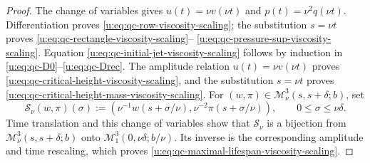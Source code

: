 \begin{proof}
The change of variables gives
\(u(t)=\nu v(\nu t)\) and \(p(t)=\nu^2q(\nu t)\).
Differentiation proves \eqref{u:eq:qc-row-viscosity-scaling}; the substitution
\(s=\nu t\) proves
\eqref{u:eq:qc-rectangle-viscosity-scaling}--%
\eqref{u:eq:qc-pressure-sup-viscosity-scaling}.
Equation \eqref{u:eq:qc-initial-jet-viscosity-scaling} follows by induction in
\eqref{u:eq:qc-D0}--\eqref{u:eq:qc-Drec}.  The amplitude relation
\(u(t)=\nu v(\nu t)\) proves
\eqref{u:eq:qc-critical-height-viscosity-scaling}, and the substitution
\(s=\nu t\) proves
\eqref{u:eq:qc-critical-height-mass-viscosity-scaling}.  For
\((w,\pi)\in\mathscr M_\nu^3(s,s+\delta;b)\), set
\[
 \mathcal S_\nu(w,\pi)(\sigma)
 :=
 \left(
  \nu^{-1}w(s+\sigma/\nu),
  \nu^{-2}\pi(s+\sigma/\nu)
 \right),
 \qquad 0\le\sigma\le\nu\delta.
\]
Time translation and this change of variables show that
\(\mathcal S_\nu\) is a bijection from
\(\mathscr M_\nu^3(s,s+\delta;b)\) onto
\(\mathscr M_1^3(0,\nu\delta;b/\nu)\).
Its inverse is the corresponding amplitude and time rescaling,
which proves \eqref{u:eq:qc-maximal-lifespan-viscosity-scaling}.
\end{proof}

